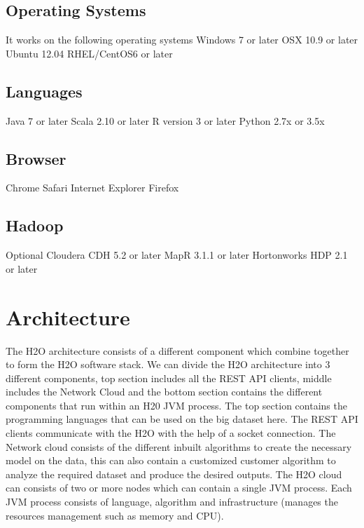 \documentclass[9pt,twocolumn,twoside]{../../styles/osajnl}
\begin{document}
\subsection{Operating Systems}
\cite{www-h2o-requirements}
It works on the following operating systems 
\newline Windows 7 or later
\newline OSX 10.9 or later
\newline Ubuntu 12.04
\newline RHEL/CentOS6 or later

\subsection{Languages}

 Java 7 or later
\newline Scala 2.10 or later
\newline R version 3 or later
\newline Python 2.7x or 3.5x
 
\subsection{Browser}

 Chrome
\newline Safari
\newline Internet Explorer
\newline Firefox

\subsection{Hadoop}
 Optional Cloudera CDH 5.2 or later
\newline MapR 3.1.1 or later
\newline Hortonworks HDP 2.1 or later

\section{Architecture}
\cite{www-h2o-architecture}
The H2O architecture consists of a different component which combine
together to form the H2O software stack. We can divide the H2O
architecture into 3 different components, top section includes all
the REST API clients, middle includes the Network Cloud and the
bottom section contains the different components that run within an
H20 JVM process. The top section contains the programming languages
that can be used on the big dataset here. The REST API clients
communicate with the H2O with the help of a socket connection. The
Network cloud consists of the different inbuilt algorithms to create
the necessary model on the data, this can also contain a customized
customer algorithm to analyze the required dataset and produce the
desired outputs.  The H2O cloud can consists of two or more nodes
which can contain a single JVM process. Each JVM process consists of
language, algorithm and infrastructure (manages the resources
management such as memory and CPU).
\end{document}
